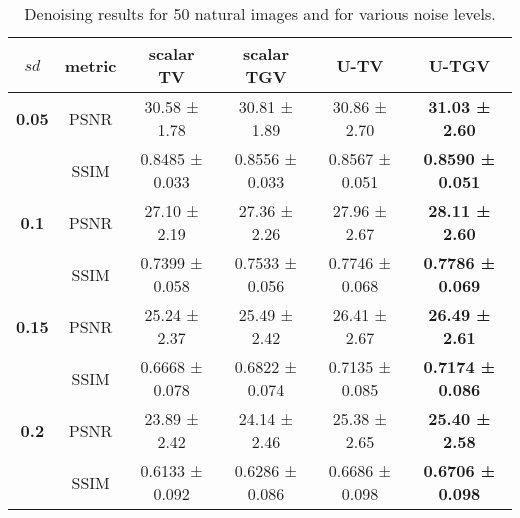 \begin{table}[!h]
    \centering
    \scriptsize 
    {\renewcommand{\arraystretch}{1.1}
    \begin{tabular}{c | c | c | c | c | c}
        $sd$ & metric & \textbf{scalar TV} & \textbf{scalar TGV} & \textbf{U-TV}  & \textbf{U-TGV} \\ \hline
        \textbf{0.05} & PSNR & 30.58 ± 1.78 & 30.81 ± 1.89 & 30.86 ± 2.70 & \textbf{31.03 ± 2.60} \\
        \textbf{} & SSIM & 0.8485 ± 0.033 & 0.8556 ± 0.033 & 0.8567 ± 0.051 &  \textbf{0.8590 ± 0.051} \\ \hline
        \textbf{0.1} & PSNR & 27.10 ± 2.19 & 27.36 ± 2.26 & 27.96 ± 2.67 & \textbf{28.11 ± 2.60} \\
        \textbf{} & SSIM & 0.7399 ± 0.058 & 0.7533 ± 0.056 & 0.7746 ± 0.068 &  \textbf{0.7786 ± 0.069} \\ \hline
        \textbf{0.15} & PSNR & 25.24 ± 2.37 & 25.49 ± 2.42 & 26.41 ± 2.67 &  \textbf{26.49 ± 2.61} \\
        \textbf{} & SSIM & 0.6668 ± 0.078 & 0.6822 ± 0.074 & 0.7135 ± 0.085 &  \textbf{0.7174 ± 0.086} \\ \hline
        \textbf{0.2} & PSNR & 23.89 ± 2.42 & 24.14 ± 2.46 & 25.38 ± 2.65 & \textbf{25.40 ± 2.58} \\
        \textbf{} & SSIM & 0.6133 ± 0.092 & 0.6286 ± 0.086 & 0.6686 ± 0.098 & \textbf{0.6706 ± 0.098} \\
    \end{tabular}
    }
    \vspace{0.5em}
    \caption{
        Denoising results for 50 natural images and for various noise levels.
    }
    \label{tab:summary_standard50_tests}
\end{table}
